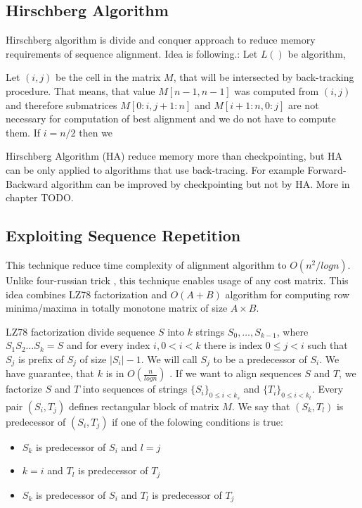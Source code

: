 \subsection{Hirschberg Algorithm}

Hirschberg algorithm is divide and conquer approach to reduce memory
requirements of sequence alignment. Idea is following.: Let $L()$ be algorithm, 




Let $(i,j)$ be the cell in the matrix $M$, that will be intersected by
back-tracking procedure. That means, that value $M[n-1,n-1]$ was computed 
from $(i,j)$ and therefore submatrices $M[0:i,j+1:n]$ and $M[i+1:n,0:j]$
are not necessary for computation of best alignment and we do not have to
compute them. If $i=n/2$ then we 


Hirschberg Algorithm (HA) reduce memory more than checkpointing, but HA can be
only applied to algorithms that use back-tracing. For example Forward-Backward
algorithm can be improved by checkpointing but not by HA. More in chapter TODO.

\subsection{Exploiting Sequence Repetition}

This technique reduce time complexity of alignment algorithm to $O(n^2/log n)$.
Unlike four-russian trick \cite{}, this technique enables usage of any cost
matrix.  This idea combines LZ78 factorization \cite{} and $O(A+B)$ algorithm
for computing row minima/maxima in totally monotone matrix of size $A\times B$\cite{}. 

LZ78 factorization divide sequence $S$ into $k$ strings $S_0,\dots,S_{k-1}$, where
$S_1S_2\dots S_k=S$ and for every index  $i,0< i <k$ there is index $0\leq j<i$
such that $S_j$ is prefix of $S_j$ of size $|S_i|-1$. We will call $S_j$ to be a
predecessor of $S_i$. We have guarantee, that $k$ is in $O(\frac{n}{log n})$
\cite{}. If we want to align sequences $S$ and $T$, we factorize $S$ and $T$
into sequences of strings $\{S_i\}_{0\leq i < k_s}$ and $\{T_i\}_{0\leq i<
k_t}$. Every pair $(S_i,T_j)$ defines rectangular block of matrix $M$.
We say that $(S_k,T_l)$ is predecessor of $(S_i,T_j)$ if one of the folowing
conditions is true:

\begin{itemize}
\item $S_k$ is predecessor of $S_i$ and $l=j$
\item $k=i$ and $T_l$ is predecessor of $T_j$
\item $S_k$ is predecessor of $S_i$ and $T_l$ is predecessor of $T_j$
\end{itemize}

